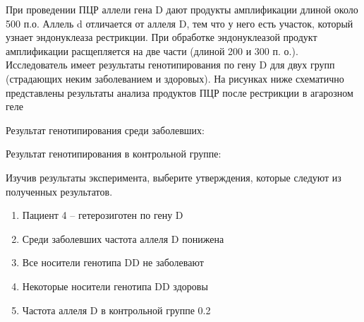 
При
проведении ПЦР аллели гена D дают
продукты амплификации длиной около 500 п.о. Аллель d отличается от аллеля D,
тем что у него есть участок, который узнает эндонуклеаза рестрикции. При
обработке эндонуклеазой продукт амплификации расщепляется на две части (длиной
200 и 300 п. о.). Исследователь имеет результаты генотипирования по гену D для двух групп (страдающих неким
заболеванием и здоровых). На рисунках ниже схематично представлены результаты
анализа продуктов ПЦР после рестрикции в агарозном геле 

Результат генотипирования среди заболевших:


Результат генотипирования в контрольной
группе:


Изучив результаты эксперимента, выберите
утверждения, которые следуют из полученных результатов.

\begin{enumerate}
    \item Пациент 4 – гетерозиготен по гену D
    \item Среди заболевших частота аллеля D понижена
    \item Все носители генотипа DD не заболевают
    \item Некоторые носители генотипа DD здоровы
    \item Частота аллеля D в контрольной группе 0.2
\end{enumerate}



